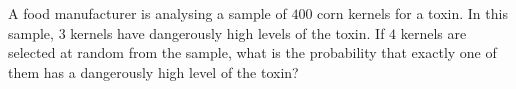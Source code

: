A food manufacturer is analysing a sample of $400$ corn kernels for a toxin. In this sample, $3$ kernels have dangerously high levels of the toxin. If $4$ kernels are selected at random from the sample, what is the probability that exactly one of them has a dangerously high level of the toxin?

